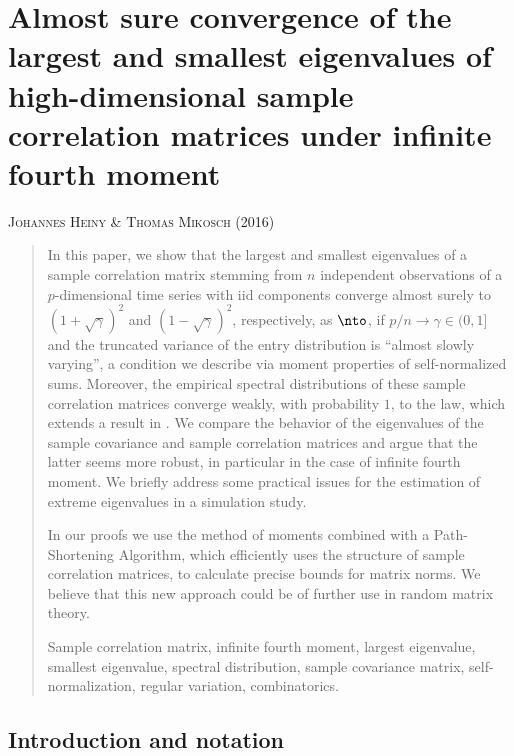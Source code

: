 \chapter[Almost sure convergence of the largest and smallest eigenvalues of high-dimensional sample correlation matrices under infinite fourth moment]{{\huge Almost sure convergence of the largest and smallest eigenvalues of high-dimensional sample correlation matrices under infinite fourth moment}}\label{ch:corr}


\begin{center}
\textsc{Johannes Heiny \& Thomas Mikosch (2016)}
\end{center}

\begin{abstract}{In this paper, we show that the largest and smallest eigenvalues 
of a sample correlation matrix stemming from $n$ independent observations of a $p$-dimensional 
time series with iid components converge almost surely to $(1+\sqrt{\gamma})^2$ and $(1-\sqrt{\gamma})^2$, 
respectively, as $\nto$, if $p/n\to \gamma \in (0,1]$ and the truncated variance of the entry 
distribution is ``almost slowly varying'', a condition we describe via moment 
properties of self-normalized sums. Moreover, the empirical spectral distributions 
of these sample correlation matrices converge weakly, with probability $1$, to the \MP law, 
which extends a result in \cite{bai:zhou:2008}. We compare the behavior of the eigenvalues of the 
sample covariance and sample correlation matrices and argue that the latter seems more robust, 
in particular in the case of infinite fourth moment. We briefly address some practical issues 
for the estimation of extreme eigenvalues in a simulation study.   
\par
In our proofs we use the method of moments combined with a Path-Shortening Algorithm, 
which efficiently uses the structure of sample correlation matrices, 
to calculate precise bounds for matrix norms. We believe that this new approach could be of further use in random matrix theory. 
\medskip

 Sample correlation matrix, infinite fourth moment, largest eigenvalue, smallest eigenvalue, 
spectral distribution, sample covariance matrix, self-normalization, regular variation, combinatorics.}
\end{abstract}

\newpage
\section{Introduction and notation}\label{sec:sdlgj}

